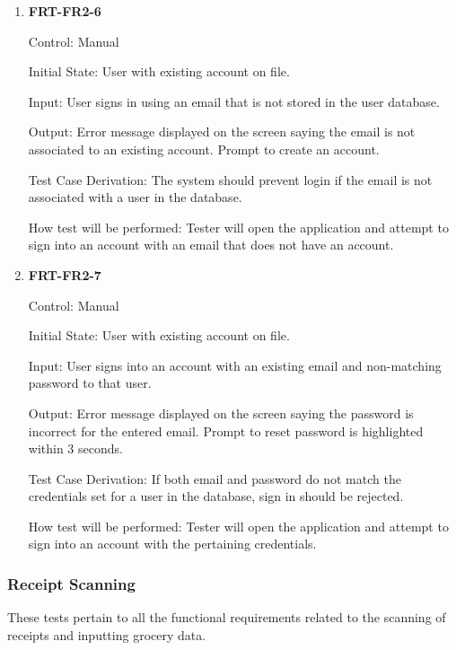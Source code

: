 \documentclass[12pt, titlepage]{article}
\begin{document}
\begin{enumerate}
\item{\textbf{FRT-FR2-6}}

Control: Manual
          
Initial State: User with existing account on file.
          
Input: User signs in using an email that is not stored in the user database.
          
Output: Error message displayed on the screen saying the email is not associated to an existing account. Prompt to create an account.

Test Case Derivation: The system should prevent login if the email is not associated with a user in the database.
          
How test will be performed: Tester will open the application and attempt to sign into an account with an email that does not have an account.

\item{\textbf{FRT-FR2-7}}

Control: Manual
          
Initial State: User with existing account on file.
          
Input: User signs into an account with an existing email and non-matching password to that user.
          
Output: Error message displayed on the screen saying the password is incorrect for the entered email. Prompt to reset password is highlighted within 3 seconds.

Test Case Derivation: If both email and password do not match the credentials set for a user in the database, sign in
should be rejected.
          
How test will be performed: Tester will open the application and attempt to sign into an account with the pertaining credentials.

\end{enumerate}

\subsubsection{Receipt Scanning}

These tests pertain to all the functional requirements related to the scanning of receipts and inputting grocery data.
\end{document}
